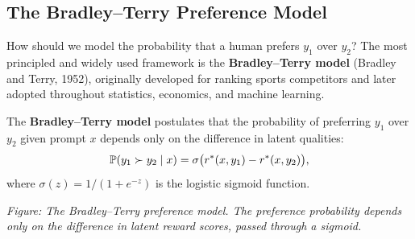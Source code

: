 \subsection{The Bradley--Terry Preference Model}

How should we model the probability that a human prefers $y_1$ over $y_2$? The most principled and widely used framework is the \textbf{Bradley--Terry model} (Bradley and Terry, 1952), originally developed for ranking sports competitors and later adopted throughout statistics, economics, and machine learning.

\begin{definition}
\label{def:bt-model}
The \textbf{Bradley--Terry model} postulates that the probability of preferring $y_1$ over $y_2$ given prompt $x$ depends only on the difference in latent qualities:
\begin{equation}
\label{eq:bt-model}
\mathbb{P}(y_1 \succ y_2 \mid x) = \sigma\bigl(r^*(x, y_1) - r^*(x, y_2)\bigr),
\end{equation}
where $\sigma(z) = 1/(1 + e^{-z})$ is the logistic sigmoid function.
\end{definition}


\begin{center}
\small\textit{Figure: The Bradley--Terry preference model. The preference probability depends only on the difference in latent reward scores, passed through a sigmoid.}
\end{center}

